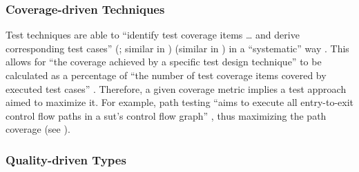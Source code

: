     \subsubsection{Coverage-driven Techniques}
    \label{cov-test}

    Test techniques are able to ``identify test coverage items \dots{} and
    derive corresponding test cases''
    \ifnotpaper
        (\citealp[p.~11]{IEEE2022}; similar in \citeyear[p.~467]{IEEE2017})
    \else
        \cite[p.~11]{IEEE2022} (similar in \cite[p.~467]{IEEE2017})
    \fi
    in a ``systematic'' way
    \citeyearpar[p.~464]{IEEE2017}.
    \ifnotpaper
        This allows for ``the coverage achieved by a specific test design
        technique'' to be calculated as a percentage of ``the number of test
        coverage items covered by executed test cases'' \citeyearpar[p.~30]{IEEE2021}.
    \fi %
    Therefore, a given coverage metric implies a test approach aimed to
    maximize it. For example, path testing ``aims to execute all entry-to-exit
    control flow paths in a \acs{sut}'s control flow graph'' \citep[p.~5-13]{SWEBOK2024},
    thus maximizing the path coverage
    \ifnotpaper
        \citep[see][Fig.~1]{SharmaEtAl2021}\else
        (see \cite[Fig.~1]{SharmaEtAl2021})\fi.

    \subsubsection{Quality-driven Types}
    \label{qual-test}

